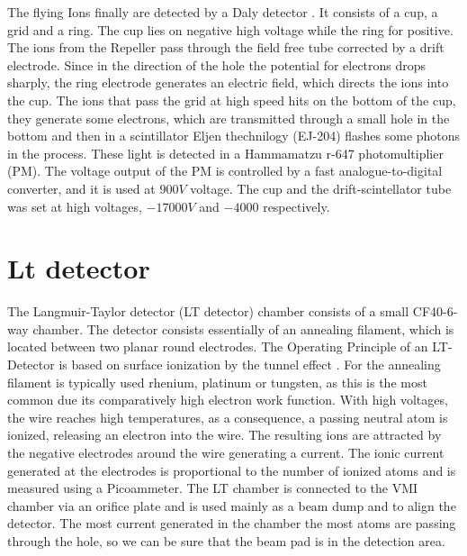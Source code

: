 The flying Ions finally are detected by a Daly detector \cite{daly_scintillation_1960}. It consists of a cup, a grid and a ring. The cup lies on negative high voltage while the ring for positive. The ions from the Repeller pass through the field free tube corrected by a drift electrode.  Since in the direction of the hole the potential for electrons drops sharply, the ring electrode generates an electric field, which directs the ions into the cup. The ions that pass the grid at high speed hits on the bottom of the cup, they generate some electrons, which are transmitted through a small hole in the bottom and then in a scintillator Eljen thechnilogy (EJ-204) flashes some photons in the process. These light is detected in a Hammamatzu r-647 photomultiplier (PM). The voltage output of the PM is controlled by a fast analogue-to-digital converter, and it is used at $900V$ voltage. The cup and the drift-scintellator  tube was set at high voltages,  $-17000V$ and $-4000$ respectively.

\section{Lt detector}

The Langmuir-Taylor detector (LT detector) chamber consists of a small CF40-6-way chamber. The detector consists essentially of an annealing filament, which is located between two planar round electrodes. The Operating Principle of an LT-Detector is based on surface ionization by the tunnel effect \cite{delhuille_optimization_2002}. For the annealing filament is typically used  rhenium, platinum or tungsten, as this is the most common due its comparatively high electron work function. With high voltages, the wire reaches high temperatures, as a consequence, a passing neutral atom is ionized, releasing an electron into the wire. The resulting ions are attracted by the negative electrodes around the wire generating a current. The ionic current generated at the electrodes is proportional to the number of ionized atoms and is measured using a Picoammeter.
The LT chamber is connected to the VMI chamber via an orifice plate and is used mainly as a beam dump and to align the detector. The most current generated in the chamber the most atoms are passing through the hole, so we can be sure that the beam pad is in the detection area.

